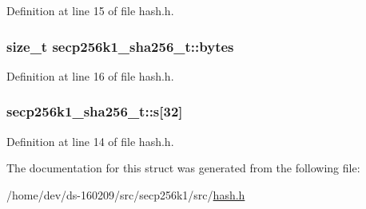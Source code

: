Definition at line 15 of file hash.\+h.

\hypertarget{structsecp256k1__sha256__t_aa427890685bc0a6db0e892d08b1918b8}{}
\subsubsection[{bytes}]{\setlength{\rightskip}{0pt plus 5cm}size\+\_\+t secp256k1\+\_\+sha256\+\_\+t\+::bytes}\label{structsecp256k1__sha256__t_aa427890685bc0a6db0e892d08b1918b8}


Definition at line 16 of file hash.\+h.

\hypertarget{structsecp256k1__sha256__t_ae795b4d52e123353b971540e366ca9cd}{}
\subsubsection[{s}]{ secp256k1\+\_\+sha256\+\_\+t\+::s\mbox{[}32\mbox{]}}\label{structsecp256k1__sha256__t_ae795b4d52e123353b971540e366ca9cd}


Definition at line 14 of file hash.\+h.



The documentation for this struct was generated from the following file\+:\begin{DoxyCompactItemize}
\item 
/home/dev/ds-\/160209/src/secp256k1/src/\hyperlink{secp256k1_2src_2hash_8h}{hash.\+h}\end{DoxyCompactItemize}
